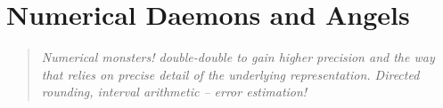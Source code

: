 \section{Numerical Daemons and Angels}
\begin{quotation}\textit{
Numerical monsters!
double-double to gain higher precision and the way that relies on
precise detail of the underlying representation.
Directed rounding, interval arithmetic -- error estimation!
}\end{quotation}
